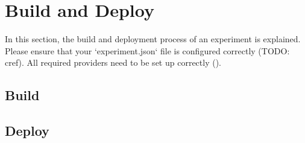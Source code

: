 \documentclass[../main.tex]{subfiles}
\begin{document}
\section{Build and Deploy}\label{sec:buildanddeploy}
In this section, the build and deployment process of an experiment is explained. Please ensure that your `experiment.json` file is configured correctly (TODO: cref). All required providers need to be set up correctly ().

\subsection{Build}\label{sec:build}

\subsection{Deploy}\label{sec:deploy}
\end{document}
